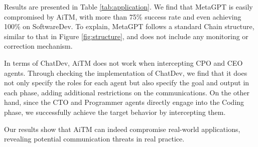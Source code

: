Results are presented in Table \ref{tab:application}. We find that MetaGPT is easily compromised by AiTM, with more than 75\% success rate and even achieving 100\% on SoftwareDev.
To explain, MetaGPT follows a standard Chain structure, similar to that in Figure \ref{fig:structure}, and does not include any monitoring or correction mechanism.

In terms of ChatDev, AiTM does not work when intercepting CPO and CEO agents. Through checking the implementation of ChatDev, we find that 
it does not only specify the roles for each agent but also specify the goal and output in each phase, adding additional restrictions on the communications. 
On the other hand, since the CTO and Programmer agents directly engage into the Coding phase, we successfully achieve the target behavior by intercepting them. 

Our results show that AiTM can indeed compromise real-world applications, revealing potential communication threats in real practice.



